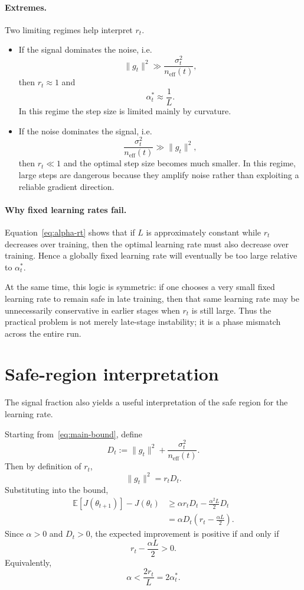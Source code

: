 \documentclass[11pt]{article}
\begin{document}
\paragraph{Extremes.}
Two limiting regimes help interpret $r_t$.
\begin{itemize}
    \item If the signal dominates the noise, i.e.
    \[
    \|g_t\|^2 \gg \frac{\sigma_t^2}{n_{\mathrm{eff}}(t)},
    \]
    then $r_t \approx 1$ and
    \[
    \alpha_t^* \approx \frac{1}{L}.
    \]
    In this regime the step size is limited mainly by curvature.

    \item If the noise dominates the signal, i.e.
    \[
    \frac{\sigma_t^2}{n_{\mathrm{eff}}(t)} \gg \|g_t\|^2,
    \]
    then $r_t \ll 1$ and the optimal step size becomes much smaller. In this regime, large steps are dangerous because they amplify noise rather than exploiting a reliable gradient direction.
\end{itemize}

\paragraph{Why fixed learning rates fail.}
Equation~\eqref{eq:alpha-rt} shows that if $L$ is approximately constant while $r_t$ decreases over training, then the optimal learning rate must also decrease over training. Hence a globally fixed learning rate will eventually be too large relative to $\alpha_t^*$.

At the same time, this logic is symmetric: if one chooses a very small fixed learning rate to remain safe in late training, then that same learning rate may be unnecessarily conservative in earlier stages when $r_t$ is still large. Thus the practical problem is not merely late-stage instability; it is a phase mismatch across the entire run.

\section{Safe-region interpretation}

The signal fraction also yields a useful interpretation of the safe region for the learning rate.

Starting from~\eqref{eq:main-bound}, define
\[
D_t := \|g_t\|^2 + \frac{\sigma_t^2}{n_{\mathrm{eff}}(t)}.
\]
Then by definition of $r_t$,
\[
\|g_t\|^2 = r_t D_t.
\]
Substituting into the bound,
\begin{align*}
\mathbb{E}[J(\theta_{t+1})]-J(\theta_t)
&\ge
\alpha r_t D_t - \frac{\alpha^2L}{2}D_t \\
&=
\alpha D_t\left(r_t - \frac{\alpha L}{2}\right).
\end{align*}
Since $\alpha>0$ and $D_t>0$, the expected improvement is positive if and only if
\[
r_t - \frac{\alpha L}{2} > 0.
\]
Equivalently,
\begin{equation}
\alpha < \frac{2r_t}{L} = 2\alpha_t^*.
\label{eq:safe-region}
\end{equation}
\end{document}
